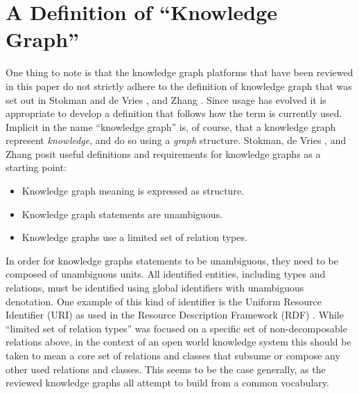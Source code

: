 \section{A Definition of ``Knowledge Graph''}

One thing to note is that the knowledge graph platforms that have been reviewed in this paper do not strictly adhere to the definition of knowledge graph that was set out in Stokman and de Vries \cite{Stokman_1988}, and Zhang \cite{zhang2002knowledge}.
Since usage has evolved it is appropriate to develop a definition that follows how the term is currently used.
Implicit in the name ``knowledge graph'' is, of course, that a knowledge graph represent \emph{knowledge}, and do so using a \emph{graph} structure.
Stokman,  de Vries \cite{Stokman_1988}, and Zhang \cite{zhang2002knowledge} posit useful definitions and requirements for knowledge graphs as a starting point:

\begin {itemize}
\item Knowledge graph meaning is expressed as structure.
\item Knowledge graph statements are unambiguous.
\item Knowledge graphs use a limited set of relation types.
\end {itemize}

In order for knowledge graphs statements to be unambiguous, they need to be composed of unambiguous units. All identified entities, including types and relations, must be identified using global identifiers with unambiguous denotation.
One example of this kind of identifier is the Uniform Resource Identifier (URI) as used in the Resource Description Framework (RDF) \cite{cyganiak2014rdf}.
While ``limited set of relation types'' was focused on a specific set of non-decomposable relations above, in the context of an open world knowledge system this should be taken to mean a core set of relations and classes that subsume or compose any other used relations and classes.
This seems to be the case generally, as the reviewed knowledge graphs all attempt to build from a common vocabulary.

